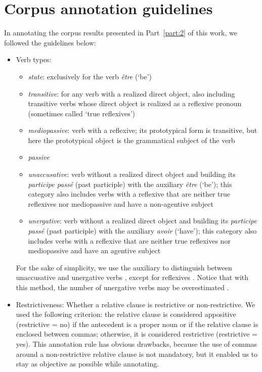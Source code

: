 \chapter{Corpus annotation guidelines}
\label{ch:corpus-methodo-annotation}
In annotating the corpus results presented in Part~\ref{part:2} of this work, we followed the guidelines below:

\begin{itemize}
    \item Verb types: 
\begin{itemize}
    \item \textit{state}: exclusively for the verb \emph{être} (`be')
    \item \textit{transitive}: for any verb with a realized direct object, also including transitive verbs whose direct object is realized as a reflexive pronoun (sometimes called `true reflexives')
    \item \textit{mediopassive}: verb with a reflexive; its prototypical form is transitive, but here the prototypical object is the grammatical subject of the verb
    \item \textit{passive}
    \item \textit{unaccusative}: verb without a realized direct object and building its \textit{participe passé} (past participle) with the auxiliary \emph{être} (`be'); this category also includes verbs with a reflexive that are neither true reflexives nor mediopassive and have a non-agentive subject
    \item \textit{unergative}: verb without a realized direct object and building its \textit{participe passé} (past participle) with the auxiliary \emph{avoir} (`have'); this category also includes verbs with a reflexive that are neither true reflexives nor mediopassive and have an agentive subject
\end{itemize}
    For the sake of simplicity, we use the auxiliary to distinguish between unaccusative and unergative verbs \citep{Labelle.1992}, except for reflexives \citep[206--208]{Legendre.2003}. Notice that with this method, the number of unergative verbs may be overestimated \citep{Legendre.2003}.
    \item Restrictiveness: Whether a relative clause is restrictive or non-restrictive. We used the following criterion: the relative clause is considered appositive (restrictive = no) if the antecedent is a proper noun or if the relative clause is enclosed between commas; otherwise, it is considered restrictive (restrictive = yes). This annotation rule has obvious drawbacks, because the use of commas around a non-restrictive relative clause is not mandatory, but it enabled us to stay as objective as possible while annotating.
\end{itemize}
